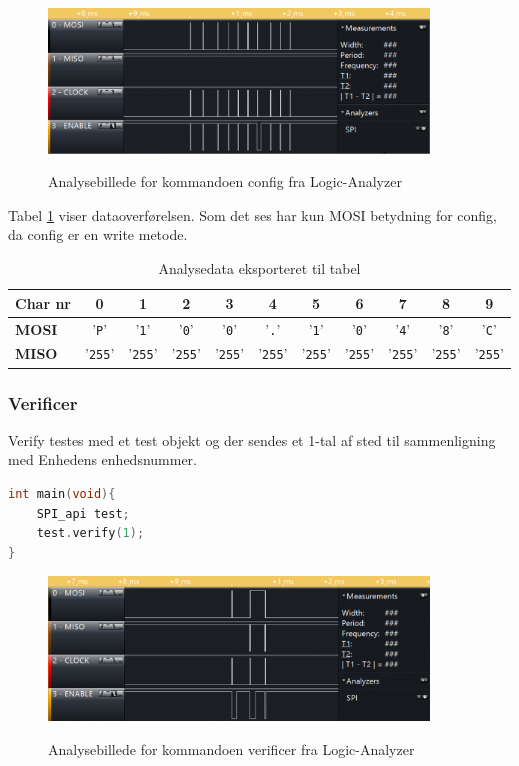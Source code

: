 \begin{figure}[H]
\centering
{\includegraphics[width=0.90\textwidth]{filer/integrationstest/billeder/spi_config}}
\caption{Analysebillede for kommandoen config fra Logic-Analyzer}
\label{lab:scop_config}
\end{figure}

Tabel \ref{table:scop_config} viser dataoverførelsen. Som det ses har kun MOSI betydning for config, da config er en write metode. 

\begin{table}[H]
	\caption{Analysedata eksporteret til tabel}
	\centering
	\begin{tabular}{|l|c|c|c|c|c|c|c|c|c|c|}
		\hline 
		\textbf{Char nr} & \textbf{0} & \textbf{1} & \textbf{2} & \textbf{3} & \textbf{4} & \textbf{5} 
						 & \textbf{6} & \textbf{7} & \textbf{8} & \textbf{9}\\ 		
		\hline 
		\textbf{MOSI} & '\verb+P+' & '\verb+1+' & '\verb+0+' & '\verb+0+' & '\verb+.+' & '\verb+1+' 
						& '\verb+0+' & '\verb+4+' & '\verb+8+' & '\verb+C+' \\ 
		\hline 
		\textbf{MISO} & '\verb+255+' & '\verb+255+' & '\verb+255+' & '\verb+255+' & '\verb+255+' & '\verb+255+' 
						& '\verb+255+' & '\verb+255+' & '\verb+255+' & '\verb+255+' \\ 
		\hline 
	\end{tabular} 
	\label{table:scop_config}
\end{table}


\subsubsection*{Verificer}
Verify testes med et test objekt og der sendes et 1-tal af sted til sammenligning med Enhedens enhedsnummer.

\begin{lstlisting}[language=C]
int main(void){
	SPI_api test;	
	test.verify(1);
}
\end{lstlisting}

\begin{figure}[H]
\centering
{\includegraphics[width=0.90\textwidth]{filer/integrationstest/billeder/spi_verify}}
\caption{Analysebillede for kommandoen verificer fra Logic-Analyzer}
\label{lab:scop_verify}
\end{figure}

